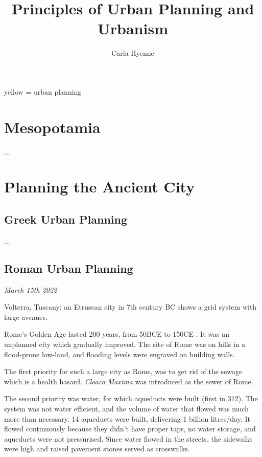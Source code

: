\documentclass{article}
\title{Principles of Urban Planning and Urbanism}
\author{Carla Hyenne}
\newcommand{\alignedmarginpar}[1]{%
        \marginpar{\raggedright\small #1}
    }
\begin{document}
\maketitle

\tableofcontents

\pagebreak

yellow = urban planning

\section{Mesopotamia}

...

\section{Planning the Ancient City}

\subsection{Greek Urban Planning}
...

\subsection{Roman Urban Planning}

\textit{March 15th 2022}

Volterra, Tuscany: an Etruscan city in 7th century BC shows a grid system with large avenues.

Rome's Golden Age lasted 200 years, from 50BCE to 150CE\alignedmarginpar{(Before) Common Era}. It was an unplanned city which gradually improved. The site of Rome was on hills in a flood-prone low-land, and flooding levels were engraved on building walls.


The first priority for such a large city as Rome, was to get rid of the sewage which is a health hasard. \textit{Cloaca Maxima} was introduced as the sewer of Rome.

The second priority was water, for which aqueducts were built (first in 312). The system was not water efficient, and the volume of water that flowed was much more than necessary. 14 aqueducts were built, delivering 1 billion litres/day. It flowed continuously because they didn't have proper taps, no water storage, and aqueducts were not pressurised. Since water flowed in the streets, the sidewalks were high and raised pavement stones served as crosswalks.
\end{document}
